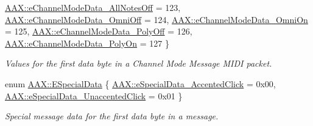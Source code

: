 \begin{DoxyCompactItemize}
\mbox{\hyperlink{a00852_a51c6649733dc2e7ce2364c7b52ddf461af57995480ec44ebcb6b936042a471979}{A\+A\+X\+::e\+Channel\+Mode\+Data\+\_\+\+All\+Notes\+Off}} = 123, 
\newline
\mbox{\hyperlink{a00852_a51c6649733dc2e7ce2364c7b52ddf461a5e2dba641939d400e47d9320b0db306a}{A\+A\+X\+::e\+Channel\+Mode\+Data\+\_\+\+Omni\+Off}} = 124, 
\mbox{\hyperlink{a00852_a51c6649733dc2e7ce2364c7b52ddf461a3defca7d2a1dc6940bbc00a14eadd2d0}{A\+A\+X\+::e\+Channel\+Mode\+Data\+\_\+\+Omni\+On}} = 125, 
\mbox{\hyperlink{a00852_a51c6649733dc2e7ce2364c7b52ddf461ac2819c2b9eeec76609fa42609b2fd878}{A\+A\+X\+::e\+Channel\+Mode\+Data\+\_\+\+Poly\+Off}} = 126, 
\mbox{\hyperlink{a00852_a51c6649733dc2e7ce2364c7b52ddf461ada14fa008d32a84173ed0f0e9d416a49}{A\+A\+X\+::e\+Channel\+Mode\+Data\+\_\+\+Poly\+On}} = 127
 \}
\begin{DoxyCompactList}\small\item\em Values for the first data byte in a Channel Mode Message M\+I\+DI packet. \end{DoxyCompactList}\item 
enum \mbox{\hyperlink{a00852_a6884ba464f3e76eb758d45daf1395199}{A\+A\+X\+::\+E\+Special\+Data}} \{ \mbox{\hyperlink{a00852_a6884ba464f3e76eb758d45daf1395199a52061b5587075953631c1389016cb0cf}{A\+A\+X\+::e\+Special\+Data\+\_\+\+Accented\+Click}} = 0x00, 
\mbox{\hyperlink{a00852_a6884ba464f3e76eb758d45daf1395199a35a276fca410721fc1c39adb01be7af3}{A\+A\+X\+::e\+Special\+Data\+\_\+\+Unaccented\+Click}} = 0x01
 \}
\begin{DoxyCompactList}\small\item\em Special message data for the first data byte in a message. \end{DoxyCompactList}\end{DoxyCompactItemize}

